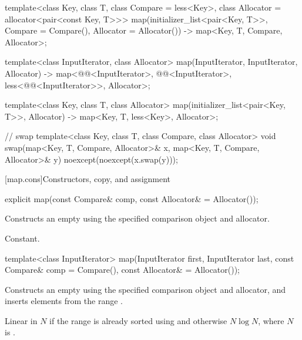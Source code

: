 \begin{codeblock}
{  template<class Key, class T, class Compare = less<Key>,
           class Allocator = allocator<pair<const Key, T>>>
    map(initializer_list<pair<Key, T>>, Compare = Compare(), Allocator = Allocator())
      -> map<Key, T, Compare, Allocator>;

  template<class InputIterator, class Allocator>
    map(InputIterator, InputIterator, Allocator)
      -> map<@@<InputIterator>, @@<InputIterator>,
             less<@@<InputIterator>>, Allocator>;

  template<class Key, class T, class Allocator>
    map(initializer_list<pair<Key, T>>, Allocator) -> map<Key, T, less<Key>, Allocator>;

  // swap
  template<class Key, class T, class Compare, class Allocator>
    void swap(map<Key, T, Compare, Allocator>& x,
              map<Key, T, Compare, Allocator>& y)
      noexcept(noexcept(x.swap(y)));
}
\end{codeblock}


[map.cons]{Constructors, copy, and assignment}%
%

%
\begin{itemdecl}
explicit map(const Compare& comp, const Allocator& = Allocator());
\end{itemdecl}

\begin{itemdescr}
\pnum
\effects
Constructs an empty
using the specified comparison object and allocator.

\pnum
\complexity
Constant.
\end{itemdescr}

%
\begin{itemdecl}
template<class InputIterator>
  map(InputIterator first, InputIterator last,
      const Compare& comp = Compare(), const Allocator& = Allocator());
\end{itemdecl}

\begin{itemdescr}
\pnum
\effects
Constructs an empty
using the specified comparison object and allocator,
and inserts elements from the range
.

\pnum
\complexity
Linear in $N$ if the range
is already sorted using 
and otherwise $N \log N$, where $N$
is .
\end{itemdescr}

